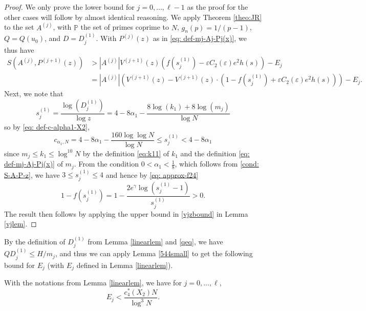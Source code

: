 \documentclass[12pt]{amsart}
\begin{document}
\begin{proof}
    We only prove the lower bound for $j=0,\ldots,\ell-1$ as the proof for the other cases will follow by almost identical reasoning. We apply Theorem \ref{theo:JR} to the set $A^{(j)}$, with $\mathbb{P}$ the set of primes coprime to $N$, $g_n(p)=1/(p-1)$, $Q=Q(u_0)$, and $D=D^{(1)}_j$. With $P^{(j)}(z)$ as in \eqref{eq: def-mj-Aj-Pj(x)}, we thus have
    \begin{align*}
        S(A^{(j)}, P^{(j+1)}(z)) &> |A^{(j)}| V^{(j+1)}(z) \left( f(s^{(1)}_j) - \varepsilon C_2(\varepsilon) e^2 h(s) \right) - E_j \\
        &= \left| A^{(j)} \right| \left( V^{(j+1)}(z) - V^{(j+1)}(z) \cdot \left( 1 - f(s^{(1)}_j) + \varepsilon C_2(\varepsilon) e^2 h(s) \right) \right)-E_j.
    \end{align*}
    Next, we note that
    \begin{equation*}
        s^{(1)}_j=\frac{\log(D^{(1)}_j)}{\log z}=4-8\alpha_1-\frac{8\log(k_1) + 8\log(m_j)}{\log N}
    \end{equation*}
    so by \eqref{eq: def-c-alpha1-X2},
    \begin{equation*}
        c_{\alpha_1,N}=4-8\alpha_1-\frac{160\log\log N}{\log N}\le s^{(1)}_j<4-8\alpha_1
    \end{equation*}
    since $m_j\le k_1\le\log^{10}N$ by the definition \eqref{eq:k11} of $k_1$ and the definition \eqref{eq: def-mj-Aj-Pj(x)} of $m_j$. From the condition $0 < \alpha_1 < \frac{1}{8}$, which follows from \eqref{cond: S-A-P-z}, we have $3\le s^{(1)}_j\le 4$ and hence by \eqref{eq: approx-f24}
    \begin{equation*}
        1-f(s^{(1)}_j)=1-\frac{2e^{\gamma}\log(s^{(1)}_j-1)}{s^{(1)}_j}>0.
    \end{equation*}
    The result then follows by applying the upper bound in \eqref{vjzbound} in Lemma \ref{vjlem}.
\end{proof}
By the definition of $D_j^{(1)}$ from Lemma \ref{linearlem} and \eqref{qeq}, we have $Q D_j^{(1)} \le H/m_j$, and thus we can apply Lemma \ref{544small} to get the following bound for $E_j$ (with $E_j$ defined in Lemma \ref{linearlem}).
\begin{lemma}\label{errorlem}
With the notations from Lemma \ref{linearlem}, we have for $j=0,\ldots,\ell$,
    \begin{equation*}
        E_j<\frac{c_4^*(X_2)N}{\log^3N}.
    \end{equation*}
\end{lemma}
~\newline
\end{document}
